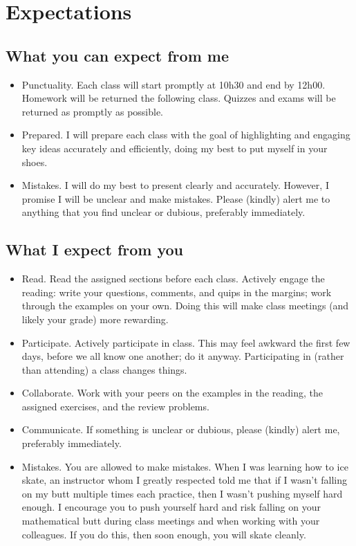\section{Expectations}

\subsection{What you can expect from me}

\begin{itemize}
\item Punctuality. Each class will start promptly at 10h30 and end by 12h00. Homework will be returned the following class. Quizzes and exams will be returned as promptly as possible.
\item Prepared. I will prepare each class with the goal of highlighting and engaging key ideas accurately and efficiently, doing my best to put myself in your shoes.
\item Mistakes. I will do my best to present clearly and accurately. However, I promise I will be unclear and make mistakes. Please (kindly) alert me to anything that you find unclear or dubious, preferably immediately.
\end{itemize}



\subsection{What I expect from you}

\begin{itemize}
\item Read. Read the assigned sections before each class. Actively engage the reading: write your questions, comments, and quips in the margins; work through the examples on your own. Doing this will make class meetings (and likely your grade) more rewarding.
\item Participate. Actively participate in class. This may feel awkward the first few days, before we all know one another; do it anyway. Participating in (rather than attending) a class changes things.
\item Collaborate. Work with your peers on the examples in the reading, the assigned exercises, and the review problems.
\item Communicate. If something is unclear or dubious, please (kindly) alert me, preferably immediately.
\item Mistakes. You are allowed to make mistakes. When I was learning how to ice skate, an instructor whom I greatly respected told me that if I wasn't falling on my butt multiple times each practice, then I wasn't pushing myself hard enough. I encourage you to push yourself hard and risk falling on your mathematical butt during class meetings and when working with your colleagues. If you do this, then soon enough, you will skate cleanly.
\end{itemize}